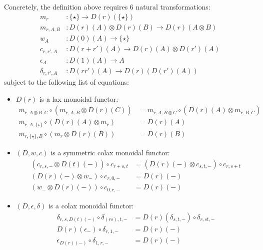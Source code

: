 Concretely, the definition above requires 6 natural transformations:
\begin{align*}
m_{r} & :\{\star\}\to  D(r)(\{\star\})\\
m_{r,A,B}& :  D(r)(A)\otimes D(r)(B)\to  D(r)(A\otimes B)\\
w_{A}& : D(0)(A)\to \{\star\} \\
c_{r,r',A}& : D(r+r')(A) \to D(r)(A)\otimes D(r')(A) \\
\epsilon_{A}& : D(1)(A)\to A \\
\delta_{r,r',A}&: D(r r')(A)\to D(r)(D(r')(A))
\end{align*}
subject to the following list of equations:
\begin{itemize}
\item $D(r)$ is a lax monoidal functor:
\begin{align}
m_{r,A\otimes B,C}\circ (m_{r,A,B}\otimes D(r)(C)) & = 
m_{r,A, B\otimes C}\circ (D(r)(A)\otimes m_{r,B,C})\\
m_{r,A,\{\star\}}\circ (D(r)(A)\otimes m_{r}) & = D(r)(A)\\
m_{r,\{\star\}, B}\circ (m_{r}\otimes D(r)(B))&= D(r)(B)
\end{align}


\item $(D,w,c)$ is a symmetric colax monoidal functor:
\begin{align}
(c_{r,s,-}\otimes D(t)(-))\circ c_{r+s,t} & =
(D(r)(-)\otimes c_{s,t,-})\circ c_{r,s+t}\\
(D(r)(-)\otimes w_{-})\circ c_{r,0,-} & = D(r)(-) \\
(w_{-}\otimes D(r)(-))\circ c_{0,r,-} & = D(r)(-)
\end{align}


\item $(D,\epsilon,\delta)$ is a colax monoidal functor:
\begin{align}
\delta_{r,s, D(t)(-)}\circ \delta_{(rs),t,-} & =
D(r)(\delta_{s,t,-})\circ \delta_{r,st,-}\\
D(r)(\epsilon_{-}) \circ \delta_{r,1,-} & = D(r)(-) \\
\epsilon_{D(r)(-)} \circ \delta_{1,r,-} & = D(r)(-)
\end{align}

\end{itemize}



